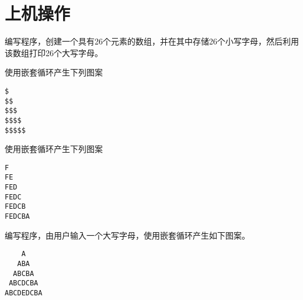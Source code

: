 \section{上机操作}
\begin{frame}[fragile]
\begin{free}[问题１]{}
  编写程序，创建一个具有26个元素的数组，并在其中存储26个小写字母，然后利用该数组打印26个大写字母。
\end{free}
\end{frame}


\begin{frame}

\end{frame}


\begin{frame}[fragile]
\begin{free}[问题２]{}
使用嵌套循环产生下列图案
\begin{lstlisting}
$
$$
$$$
$$$$
$$$$$
\end{lstlisting}
\end{free}
\end{frame}

\begin{frame}

\end{frame}

\begin{frame}[fragile]
  \begin{free}[问题3]{}
    使用嵌套循环产生下列图案
\begin{lstlisting}
F
FE
FED
FEDC
FEDCB
FEDCBA
\end{lstlisting}
\end{free}
\end{frame}

\begin{frame}

\end{frame}

\begin{frame}[fragile]
\begin{free}[问题4]{}
  编写程序，由用户输入一个大写字母，使用嵌套循环产生如下图案。
\begin{lstlisting}
    A
   ABA
  ABCBA
 ABCDCBA
ABCDEDCBA
\end{lstlisting}
\end{free}
\end{frame}

\begin{frame}

\end{frame}

